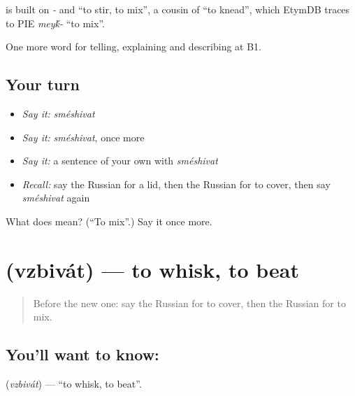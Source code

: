 \begin{cousinweb}
\emph{} is built on \emph{-} and \emph{} \textquotedblleft{}to stir, to mix\textquotedblright{}, a cousin of \emph{} \textquotedblleft{}to knead\textquotedblright{}, which EtymDB traces to PIE \emph{mey\'{k}-} \textquotedblleft{}to mix\textquotedblright{}.
\end{cousinweb}

\begin{grammarlens}[title={What you've built}]
One more word for telling, explaining and describing at B1.
\end{grammarlens}

\subsection*{Your turn}
\begin{itemize}
\raggedright
  \item \emph{Say it:} \emph{sméshivat}
  \item \emph{Say it:} \emph{sméshivat}, once more
  \item \emph{Say it:} a sentence of your own with \emph{sméshivat}
  \item \emph{Recall:} say the Russian for a lid, then the Russian for to cover, then say \emph{sméshivat} again
\end{itemize}

\begin{tcolorbox}[breakable,colback=teal!4,colframe=teal!35!black,title={Before you move on}]
What does  mean? (\textquotedblleft{}To mix\textquotedblright{}.) Say it once more.
\end{tcolorbox}
\section[\texorpdfstring{\ru{взбивать} (vzbivát)}{взбивать (vzbivát)}]{ (vzbivát) — to whisk, to beat}

\label{lesson:RU-C330-vzbivat}



\begin{quote}
Before the new one: say the Russian for to cover, then the Russian for to mix.
\end{quote}

\subsection*{You'll want to know: }
\textbf{} (\emph{vzbivát}) — \textquotedblleft{}to whisk, to beat\textquotedblright{}.

